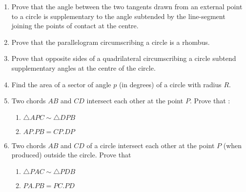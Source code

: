 \begin{enumerate}[label=\arabic*.,ref=\thesubsection.\theenumi]
\item Prove that the angle between the two tangents drawn from an external point to a circle is supplementary to the angle subtended by the line-segment joining the points of contact at the centre.
\item  Prove that the parallelogram circumscribing a circle is a rhombus.
%
\item Prove that opposite sides of a quadrilateral circumscribing a circle subtend supplementary angles at the centre of the circle.
%
\item Find the area of a sector of angle $p$ (in degrees) of a circle with radius $R$. 
\item  Two chords $AB$ and $CD$ intersect each other at the point $P$. Prove that : 
\begin{enumerate}
\item   $\triangle  APC  \sim   \triangle  DPB$
\item  $AP . PB = CP . DP$
\end{enumerate}
\item Two chords $AB$ and $CD$ of a circle intersect each other at the point $P$ (when produced) outside the circle. Prove that 
\begin{enumerate}
\item   $\triangle  PAC  \sim   \triangle  PDB$
\item  $PA . PB = PC . PD$
\end{enumerate}

\end{enumerate}
